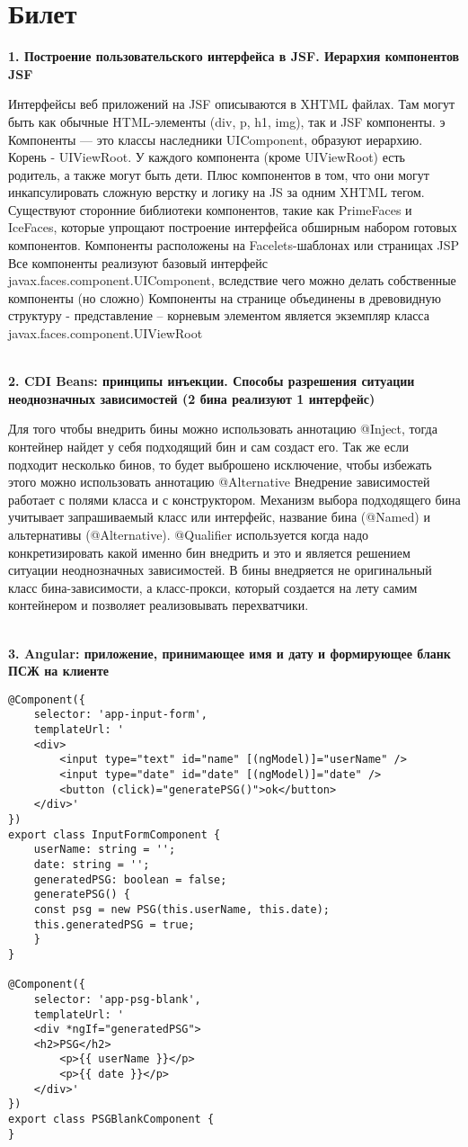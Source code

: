 \documentclass{article}
\newcommand{\bil}[5]{%
        \section{Билет}
        \textbf{1. #1}

        #4
        \\
        \textbf{2. #2}
        
        #5
        \\
        \textbf{3. #3}
}
\begin{document}
\bil{Построение пользовательского интерфейса в JSF. Иерархия компонентов JSF}
{CDI Beans: принципы инъекции. Способы разрешения ситуации неоднозначных зависимостей (2 бина реализуют 1 интерфейс)}
{Angular: приложение, принимающее имя и дату и формирующее бланк ПСЖ на клиенте}{
    Интерфейсы веб приложений на JSF описываются в XHTML файлах. 
    Там могут быть как обычные HTML-элементы (div, p, h1, img), так и JSF компоненты. э
    Компоненты — это классы наследники UIComponent, образуют иерархию. 
    Корень - UIViewRoot. У каждого компонента (кроме UIViewRoot) есть родитель, а также могут быть дети. 
    Плюс компонентов в том, что они могут инкапсулировать сложную верстку и логику на JS за одним XHTML тегом. 
    Существуют сторонние библиотеки компонентов, такие как PrimeFaces и IceFaces, которые упрощают построение интерфейса обширным набором готовых компонентов. 
    Компоненты расположены на Facelets-шаблонах или страницах JSP 
    Все компоненты реализуют базовый интерфейс javax.faces.component.UIComponent, вследствие чего можно делать собственные компоненты (но сложно)
    Компоненты на странице объединены в древовидную структуру - представление – корневым элементом является экземпляр класса javax.faces.component.UIViewRoot
}{
    Для того чтобы внедрить бины можно использовать аннотацию @Inject, тогда контейнер найдет у себя подходящий бин и сам создаст его. 
    Так же если подходит несколько бинов, то будет выброшено исключение, чтобы избежать этого можно использовать аннотацию @Alternative Внедрение зависимостей работает с полями класса и с конструктором. 
    Механизм выбора подходящего бина учитывает запрашиваемый класс или интерфейс, название бина (@Named) и альтернативы (@Alternative). 
    @Qualifier используется когда надо конкретизировать какой именно бин внедрить и это и является решением ситуации неоднозначных зависимостей. В бины внедряется не оригинальный класс бина-зависимости, а класс-прокси, который создается на лету самим контейнером и позволяет реализовывать перехватчики.
}
\begin{lstlisting}[frame=single, basicstyle=\ttfamily, breaklines=true, breakatwhitespace=true, postbreak=\mbox{\textcolor{red}{$\hookrightarrow$}\space}]
@Component({
    selector: 'app-input-form',
    templateUrl: '
    <div>
        <input type="text" id="name" [(ngModel)]="userName" />
        <input type="date" id="date" [(ngModel)]="date" />
        <button (click)="generatePSG()">ok</button>
    </div>'
})
export class InputFormComponent {
    userName: string = '';
    date: string = '';
    generatedPSG: boolean = false;
    generatePSG() {
    const psg = new PSG(this.userName, this.date);
    this.generatedPSG = true;
    }
}

@Component({
    selector: 'app-psg-blank',
    templateUrl: '
    <div *ngIf="generatedPSG">
    <h2>PSG</h2>
        <p>{{ userName }}</p>
        <p>{{ date }}</p>
    </div>'
})
export class PSGBlankComponent {
}
        
    
\end{lstlisting}
\end{document}
